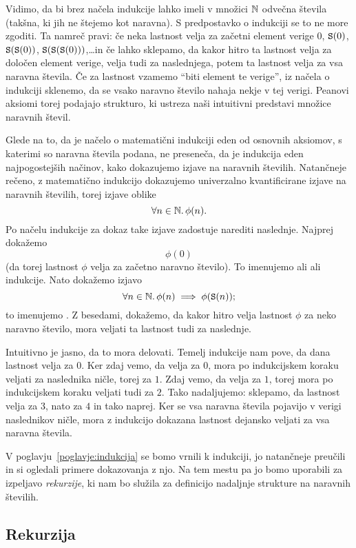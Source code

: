 Vidimo, da bi brez načela indukcije lahko imeli v množici $\mathbb{N}$ odvečna števila (takšna, ki jih ne štejemo kot naravna). S predpostavko o indukciji se to ne more zgoditi. Ta namreč pravi: če neka lastnost velja za začetni element verige $0$, $\mathtt{S}(0)$, $\mathtt{S}(\mathtt{S}(0))$, $\mathtt{S}(\mathtt{S}(\mathtt{S}(0)))$,\ldots in če lahko sklepamo, da kakor hitro ta lastnost velja za določen element verige, velja tudi za naslednjega, potem ta lastnost velja za vsa naravna števila. Če za lastnost vzamemo ``biti element te verige'', iz načela o indukciji sklenemo, da se vsako naravno število nahaja nekje v tej verigi. Peanovi aksiomi torej podajajo strukturo, ki ustreza naši intuitivni predstavi množice naravnih števil.

Glede na to, da je načelo o matematični indukciji eden od osnovnih aksiomov, s katerimi so naravna števila podana, ne preseneča, da je indukcija eden najpogostejših načinov, kako dokazujemo izjave na naravnih številih. Natančneje rečeno, z matematično indukcijo dokazujemo univerzalno kvantificirane izjave na naravnih številih, torej izjave oblike
\[\forall n \in \mathbb{N} .\, \phi(n).\]
Po načelu indukcije za dokaz take izjave zadostuje narediti naslednje. Najprej dokažemo
\[\phi(0)\]
(da torej lastnost $\phi$ velja za začetno naravno število). To imenujemo  ali  ali  indukcije. Nato dokažemo izjavo
\[\forall n \in \mathbb{N} .\, \phi(n) \implies \phi(\mathtt{S}(n));\]
to imenujemo . Z besedami, dokažemo, da kakor hitro velja lastnost $\phi$ za neko naravno število, mora veljati ta lastnost tudi za naslednje.

Intuitivno je jasno, da to mora delovati. Temelj indukcije nam pove, da dana lastnost velja za $0$. Ker zdaj vemo, da velja za $0$, mora po indukcijskem koraku veljati za naslednika ničle, torej za $1$. Zdaj vemo, da velja za $1$, torej mora po indukcijskem koraku veljati tudi za $2$. Tako nadaljujemo: sklepamo, da lastnost velja za $3$, nato za $4$ in tako naprej. Ker se vsa naravna števila pojavijo v verigi naslednikov ničle, mora z indukcijo dokazana lastnost dejansko veljati za vsa naravna števila.

V poglavju~\ref{poglavje:indukcija} se bomo vrnili k indukciji, jo natančneje preučili in si ogledali primere dokazovanja z njo. Na tem mestu pa jo bomo uporabili za izpeljavo \emph{rekurzije}, ki nam bo služila za definicijo nadaljnje strukture na naravnih številih.

\subsection{Rekurzija}\label{podrazdelek:rekurzija}

